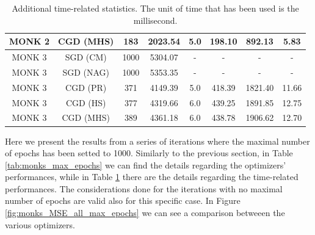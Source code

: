 \begin{table}[H]
\begin{subtable}{\textwidth}
{\begin{tabular}{| c | c | c | c | c | c | c | c |}
                            \hline
                            MONK 2 &  CGD (MHS) &               183 &       2023.54 &            5.0 &   198.10 &   892.13 &      5.83 \\
                            \hline
                            \hline
                            MONK 3 &   SGD (CM) &              1000 &       5304.07 &              - &        - &        - &         - \\
                            \hline
                            MONK 3 &  SGD (NAG) &              1000 &       5353.35 &              - &        - &        - &         - \\
                            \hline
                            \rowcolor[gray]{.9}
                            MONK 3 &   CGD (PR) &               371 &       4149.39 &            5.0 &   418.39 &  1821.40 &     11.66 \\
                            \hline
                            MONK 3 &   CGD (HS) &               377 &       4319.66 &            6.0 &   439.25 &  1891.85 &     12.75 \\
                            \hline
                            MONK 3 &  CGD (MHS) &               389 &       4361.18 &            6.0 &   438.78 &  1906.62 &     12.70 \\
                            \hline
                        \end{tabular}
                    }
                \end{subtable}
                \caption{Additional time-related statistics. The unit of time that has been used is the
                millisecond.}
                \label{tab:monks_additional_max_epochs}
            \end{table}

            Here we present the results from a series of iterations where the maximal number of epochs has
            been setted to 1000. Similarly to the previous section, in Table \ref{tab:monks_max_epochs} we
            can find the details regarding the optimizers' performances, while in Table
            \ref{tab:monks_additional_max_epochs} there are the details regarding the time-related
            performances. The considerations done for the iterations with no maximal number of epochs are
            valid also for this specific case. In Figure \ref{fig:monks_MSE_all_max_epochs} we can see a
            comparison betweeen the various optimizers.

